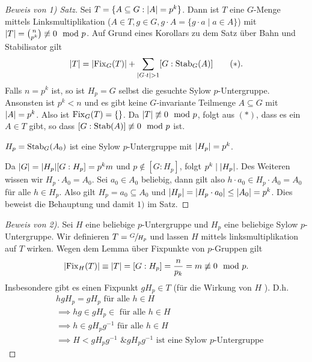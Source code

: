 \begin{proof}[Beweis von 1) Satz]
	Sei $T = \{ A \subseteq G: \abs{A} = p^{k}\} $. Dann ist $T$ eine $G$-Menge mittels Linksmultiplikation ($A \in T, g \in G, g \cdot A = \{g \cdot a \mid a \in A\}$)
	mit $\abs{T} = \binom{n}{p^{k}} \not\equiv 0 \mod p$.
	Auf Grund eines Korollars zu dem Satz über Bahn und Stabilisator gilt
	\[
		\abs{T} = \abs{\operatorname{Fix}_{G}(T)} + \sum_{\abs{G \cdot t} > 1} [G: \operatorname{Stab}_{G}(A)] \tag{$*$}
	.\] 
	Falls $n = p^{k}$ ist, so ist $H_{p} = G$ selbst die gesuchte Sylow $p$-Untergruppe.
	Ansonsten ist $p^{k} < n$ und es gibt keine $G$-invariante Teilmenge $A \subseteq G$ mit $\abs{A} = p^{k}$.
	Also ist $\operatorname{Fix}_{G}(T) = \{\} $. Da $\abs{T} \not\equiv 0 \mod p$, folgt aus $(*)$, dass es ein $A \in T$ gibt, so dass $[G: \operatorname{Stab}(A)] \not\equiv 0 \mod p$ ist.

	\begin{remark}
		$H_{p} = \operatorname{Stab}_{G}(A_0)$ ist eine Sylow $p$-Untergruppe mit $\abs{H_{p}} = p^{k}$.
	\end{remark}
		Da $\abs{G} = \abs{H_{p}} [G: H_{p}] = p^{k} m $ und $p \not\in [G: H_{p}]$, folgt $p^{k} \mid \abs{H_{p}}$.
		Des Weiteren wissen wir $H_{p} \cdot A_0 = A_0$. Sei $a_0 \in A_0$ beliebig, dann gilt also
		$h \cdot a_0 \in H_{p} \cdot A_0 = A_0$ für alle $h \in H_{p}$.
		Also gilt $H_{p} = a_0 \subseteq A_0$ und $\abs{H_{p}} = \abs{H_{p} \cdot a_0} \leq \abs{A_0} = p^{k}$.
		Dies beweist die Behauptung und damit $1)$ im Satz.
\end{proof}

\begin{proof}[Beweis von 2)]
	Sei $H$ eine beliebige $p$-Untergruppe und $H_{p}$ eine beliebige Sylow $p$-Untergruppe.
	Wir definieren $T = \sfrac{G}{H_{p}}$ und lassen $H$ mittels linksmultiplikation auf $T$ wirken.
	Wegen dem Lemma über Fixpunkte von $p$-Gruppen gilt
	\[
		\abs{\operatorname{Fix}_{H}(T)} \equiv \abs{T} = [G: H_{p}] = \frac{n}{p_{k}} = m \not\equiv 0 \mod p
	.\] 
	Insbesondere gibt es einen Fixpunkt $g H_{p} \in T$ (für die Wirkung von $H$ ).
	D.h. 
	\begin{align*}
		&hg H_{p} = g H_{p} \text{ für alle } h \in H\\
		&\implies hg \in g H_{p} \in \text{ für alle } h \in H\\
		&\implies h \in g H_{p} g^{-1} \text{ für alle } h \in H\\
		&\implies H < g H_{p} g^{-1} \text{ \& } g H_{p} g^{-1} \text{ ist eine Sylow $p$-Untergruppe}
	\end{align*}
\end{proof}

